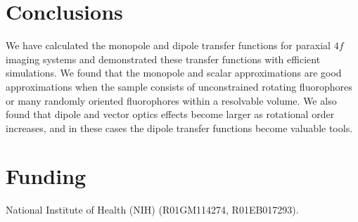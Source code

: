 \documentclass[]{osa-article}
\providecommand{\mbb}[1]{\mathbb{#1}}
\begin{document}

\section{Conclusions}

We have calculated the monopole and dipole transfer functions for paraxial
  $4f$ imaging systems and demonstrated these transfer functions with efficient
  simulations. We found that the monopole and scalar approximations are good
  approximations when the sample consists of unconstrained rotating fluorophores
  or many randomly oriented fluorophores within a resolvable volume. We also
  found that dipole and vector optics effects become larger as rotational order
  increases, and in these cases the dipole transfer functions become valuable
  tools.

\section*{Funding}
National Institute of Health (NIH) (R01GM114274, R01EB017293).
\end{document}
